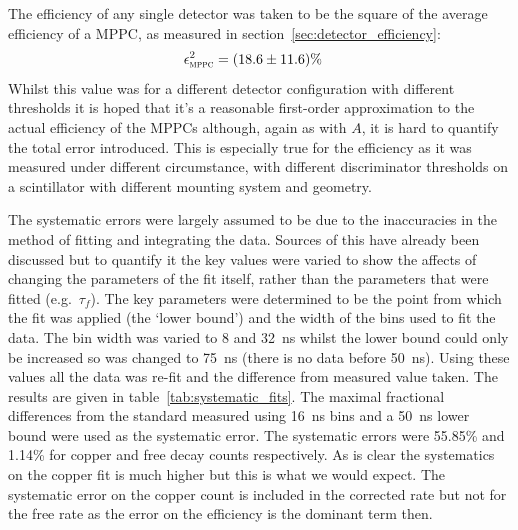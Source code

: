 The efficiency of any single detector was taken to be the square of the average efficiency of a MPPC, as measured in section~\ref{sec:detector_efficiency}:
\begin{align}
  \epsilon_{\textsc{mppc}}^2 &= (18.6 \pm 11.6)\% 
\end{align}
Whilst this value was for a different detector configuration with different thresholds it is hoped that it's a reasonable first-order approximation to the actual efficiency of the MPPCs although, again as with \(A\), it is hard to quantify the total error introduced. This is especially true for the efficiency as it was measured under different circumstance, with different discriminator thresholds on a scintillator with different mounting system and geometry.

The systematic errors were largely assumed to be due to the inaccuracies in the method of fitting and integrating the data. Sources of this have already been discussed but to quantify it the key values were varied to show the affects of changing the parameters of the fit itself, rather than the parameters that were fitted (e.g.\ \(\tau_f\)). The key parameters were determined to be the point from which the fit was applied (the `lower bound') and the width of the bins used to fit the data. The bin width was varied to 8 and 32~ns whilst the lower bound could only be increased so was changed to 75~ns (there is no data before 50~ns). Using these values all the data was re-fit and the difference from measured value taken. The results are given in table~\ref{tab:systematic_fits}. The maximal fractional differences from the standard measured using 16~ns bins and a 50~ns lower bound were used as the systematic error. The systematic errors were 55.85\% and 1.14\% for copper and free decay counts respectively. As is clear the systematics on the copper fit is much higher but this is what we would expect. The systematic error on the copper count is included in the corrected rate but not for the free rate as the error on the efficiency is the dominant term then.

